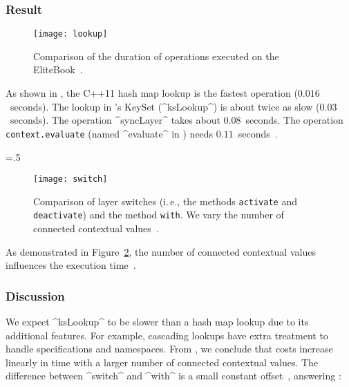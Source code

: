 \subsubsection{Result}






\begin{figure}[htp]
\centering
\texttt{[image: lookup]}
\caption[EliteBook: Performance of operations.]{Comparison of the duration of operations executed on the EliteBook~\cite{raab2015global}.}
\label{fig:lookup}
\end{figure}

As shown in , the C++11 hash map lookup is the fastest operation ($0.016$~seconds).
The lookup in \elektra{}'s KeySet (^ksLookup^) is about twice as slow ($0.03$~seconds).
The operation ^syncLayer^ takes about $0.08$~seconds.
The operation \linebreak \texttt{context.evaluate} (named ^evaluate^ in ) needs $0.11$~seconds~\cite{raab2015global}.%
{\parfillskip=0pt \emergencystretch=.5\textwidth \par}

\begin{figure}[htp]
\centering
\texttt{[image: switch]}
\caption[Comparison of layer switches.]{Comparison of layer switches (i.\,e., the methods \texttt{activate} and \texttt{deactivate}) and the method \texttt{with}.
We vary the number of connected contextual values~\cite{raab2015global}.}
\label{fig:switch}
\end{figure}

As demonstrated in Figure~\ref{fig:switch}, the number of connected contextual values influences the execution time~\cite{raab2015global}.


\subsubsection{Discussion}

We expect ^ksLookup^ to be slower than a hash map lookup due to its additional features.
For example, cascading lookups have extra treatment to handle specifications and namespaces.
From , we conclude that costs increase linearly in time with a larger number of connected contextual values.
The difference between ^switch^ and ^with^ is a small constant offset~\cite{raab2015global}, answering :
\rqEvaluationFrontendPerformanceComparison*

